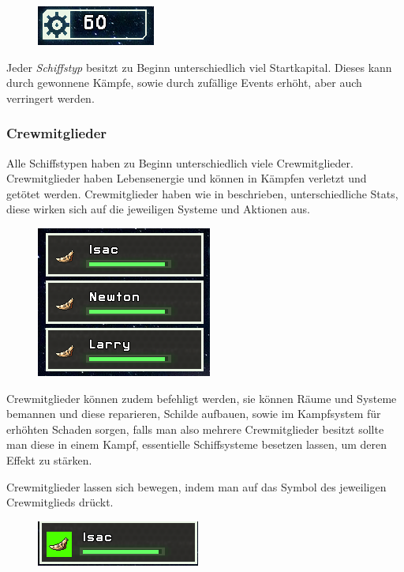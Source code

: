 \documentclass[fontsize=12pt,paper=a4,twoside]{scrartcl}
\begin{document}
\begin{figure}[H]
\centering
\includegraphics[width=0.4\linewidth]{DasSpiel/Ui/Money.png}
\end{figure}

Jeder \textit{Schiffstyp} besitzt zu Beginn unterschiedlich viel Startkapital. Dieses kann durch gewonnene Kämpfe, sowie durch zufällige Events erhöht, aber auch verringert werden. 

\subsubsection{Crewmitglieder}
Alle Schiffstypen haben zu Beginn unterschiedlich viele Crewmitglieder. Crewmitglieder haben Lebensenergie und können in Kämpfen verletzt und getötet werden. Crewmitglieder haben wie in  beschrieben, unterschiedliche Stats, diese wirken sich auf die jeweiligen Systeme und Aktionen aus.
\begin{figure}[H]
\centering
\includegraphics[width=0.4\linewidth]{DasSpiel/Ui/Crew.png}
\end{figure}
Crewmitglieder können zudem befehligt werden, sie können Räume und Systeme bemannen und diese reparieren, Schilde aufbauen, sowie im Kampfsystem für erhöhten Schaden sorgen, falls man also mehrere Crewmitglieder besitzt sollte man diese in einem Kampf, essentielle Schiffsysteme besetzen lassen, um deren Effekt zu stärken.

Crewmitglieder lassen sich bewegen, indem man auf das Symbol des jeweiligen Crewmitglieds drückt.
\begin{figure}[H]
\centering
\includegraphics[width=0.4\linewidth]{DasSpiel/Ui/crew_highlight.png}
\end{figure}
\end{document}
